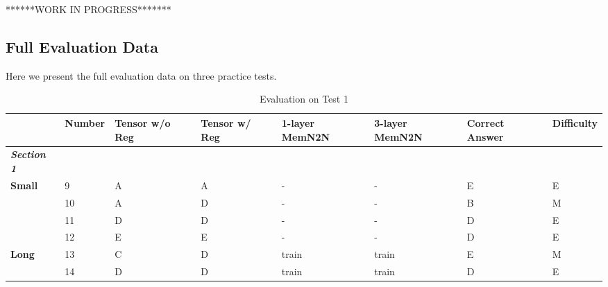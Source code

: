 \documentclass[pageno]{jpaper}
\newcommand{\textbi}[1]{\textbf{\textit{#1}}}
\begin{document}
******WORK IN PROGRESS*******

\subsection{Full Evaluation Data}
\label{Full Evaluation Data}
Here we present the full evaluation data on three practice tests.

\begin{table}[]
\scriptsize
\centering
\caption{Evaluation on Test 1}
\label{tab: Evaluation on Test 1}
\begin{tabular}{llllllll}
\toprule
                         & \textbf{Number} & \textbf{Tensor w/o Reg} & \textbf{Tensor w/ Reg} & \textbf{1-layer MemN2N} & \textbf{3-layer MemN2N} & \textbf{Correct Answer} & \textbf{Difficulty} \\ \midrule
\textbi{Section 1}       &                 &                         &                        &                         &                         &                         &                     \\ \midrule
\textbf{Small}           & 9               & A                       & A                      & -                       & -                       & E                       & E                   \\
\textbf{}                & 10              & A                       & D                      & -                       & -                       & B                       & M                   \\
\textbf{}                & 11              & D                       & D                      & -                       & -                       & D                       & E                   \\
\textbf{}                & 12              & E                       & E                      & -                       & -                       & D                       & E                   \\
\textbf{Long}            & 13              & C                       & D                      & train                   & train                   & E                       & M                   \\
\textbf{}                & 14              & D                       & D                      & train                   & train                   & D                       & E                   \\

\end{tabular}
\end{table}
\end{document}
